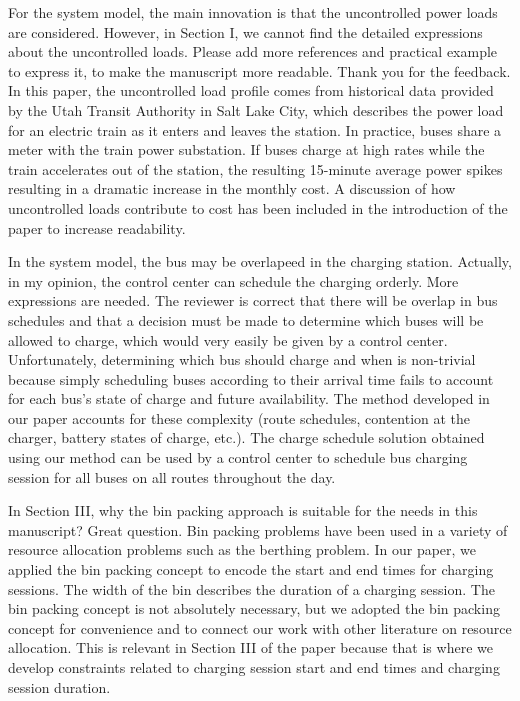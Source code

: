 \documentclass{article}
\begin{document}
\begin{buttkissing}
	\reviewerclaims For the system model, the main innovation is that the uncontrolled power loads are considered. However, in Section I, we cannot find the detailed expressions about the uncontrolled loads. Please add more references and practical example to express it, to make the manuscript more readable.
	\kissbutt Thank you for the feedback. In this paper, the uncontrolled load profile comes from historical data provided by the Utah Transit Authority in Salt Lake City, which describes the power load for an electric train as it enters and leaves the station. In practice, buses share a meter with the train power substation. If buses charge at high rates while the train accelerates out of the station, the resulting 15-minute average power spikes resulting in a dramatic increase in the monthly cost.  A discussion of how uncontrolled loads contribute to cost has been included in the introduction of the paper to increase readability.
	
	\reviewerclaims In the system model, the bus may be overlapeed in the charging station. Actually, in my opinion, the control center can schedule the charging orderly. More expressions are needed.
	\kissbutt The reviewer is correct that there will be overlap in bus schedules and that a decision must be made to determine which buses will be allowed to charge, which would very easily be given by a control center. Unfortunately, determining which bus should charge and when is non-trivial because simply scheduling buses according to their arrival time fails to account for each bus's state of charge and future availability.  The method developed in our paper accounts for these complexity (route schedules, contention at the charger, battery states of charge, etc.).  The charge schedule solution obtained using our method can be used by a control center to schedule bus charging session for all buses on all routes throughout the day.
	
	\reviewerclaims In Section III, why the bin packing approach is suitable for the needs in this manuscript?
	\kissbutt Great question. Bin packing problems have been used in a variety of resource allocation problems such as the berthing problem. In our paper, we applied the bin packing concept to encode the start and end times for charging sessions.  The width of the bin describes the duration of a charging session.  The bin packing concept is not absolutely necessary, but we adopted the bin packing concept for convenience and to connect our work with other literature on resource allocation.  This is relevant in Section III of the paper because that is where we develop constraints related to charging session start and end times and charging session duration.
	

\end{buttkissing}
\end{document}
